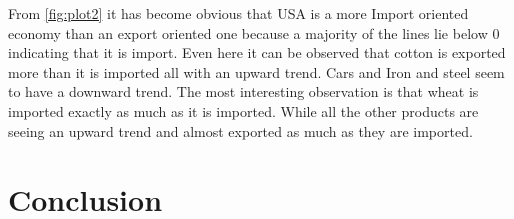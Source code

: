 \documentclass[11pt,a4paper,]{article}
\begin{document}
From \ref{fig:plot2} it has become obvious that USA is a more Import oriented economy than an export oriented one because a majority of the lines lie below 0 indicating that it is import. Even here it can be observed that cotton is exported more than it is imported all with an upward trend. Cars and Iron and steel seem to have a downward trend. The most interesting observation is that wheat is imported exactly as much as it is imported. While all the other products are seeing an upward trend and almost exported as much as they are imported.

\section*{Conclusion}

\printbibliography
\end{document}
